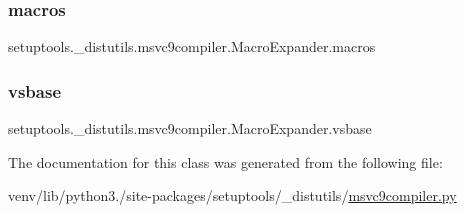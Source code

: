 \subsubsection{\texorpdfstring{macros}{macros}}
{\footnotesize\ttfamily setuptools.\+\_\+distutils.\+msvc9compiler.\+Macro\+Expander.\+macros}

\mbox{\label{classsetuptools_1_1__distutils_1_1msvc9compiler_1_1MacroExpander_aa470503f0f0d295d0d6f11c9e9440d8d}} 
\subsubsection{\texorpdfstring{vsbase}{vsbase}}
{\footnotesize\ttfamily setuptools.\+\_\+distutils.\+msvc9compiler.\+Macro\+Expander.\+vsbase}



The documentation for this class was generated from the following file\+:\begin{DoxyCompactItemize}
\item 
venv/lib/python3./site-\/packages/setuptools/\+\_\+distutils/\hyperlink{setuptools_2__distutils_2msvc9compiler_8py}{msvc9compiler.\+py}\end{DoxyCompactItemize}
